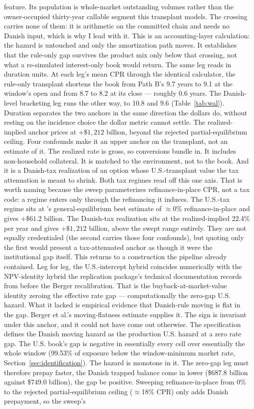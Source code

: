 \documentclass[12pt]{article}
\begin{document}
feature. Its population is whole-market outstanding volumes rather than the owner-occupied thirty-year callable segment this transplant models. The crossing carries none of them: it is arithmetic on the committed chain and needs no Danish input, which is why I lead with it. This is an accounting-layer calculation: the hazard is untouched and only the amortization path moves. It establishes that the rule-only gap survives the product mix only below that crossing, not what a re-simulated interest-only book would return. The same leg reads in duration units. At each leg's mean CPR through the identical calculator, the rule-only transplant shortens the book from Path B's 9.7 years to 9.1 at the window's open and from 8.7 to 8.2 at its close --- roughly 0.6 years. The Danish-level bracketing leg runs the other way, to 10.8 and 9.6 (Table~\ref{tab:wal}). Duration separates the two anchors in the same direction the dollars do, without resting on the incidence choice the dollar metric cannot settle. The realized-implied anchor prices at $+\$1{,}212$ billion, beyond the rejected partial-equilibrium ceiling. Four confounds make it an upper anchor on the transplant, not an estimate of it. The realized rate is gross, so conversions bundle in. It includes non-household collateral. It is matched to the environment, not to the book. And it is a Danish-tax realization of an option whose U.S.-transplant value the tax attenuation is meant to shrink. Both tax regimes read off this one axis. That is worth naming because the sweep parameterizes refinance-in-place CPR, not a tax code: a regime enters only through the refinancing it induces. The U.S.-tax regime sits at \citeauthor{berger2026}'s general-equilibrium best estimate of $\approx$0\% refinance-in-place and gives $+\$61.2$ billion. The Danish-tax realization sits at the realized-implied 22.4\% per year and gives $+\$1{,}212$ billion, above the swept range entirely. They are not equally credentialed (the second carries those four confounds), but quoting only the first would present a tax-attenuated anchor as though it were the institutional gap itself. This returns to a construction the pipeline already contained. Leg for leg, the U.S.-intercept hybrid coincides numerically with the NPV-identity hybrid the replication package's technical documentation records from before the Berger recalibration. That is the buyback-at-market-value identity zeroing the effective rate gap --- computationally the zero-gap U.S. hazard. What it lacked is empirical evidence that Danish-rule moving is flat in the gap. Berger et al.'s moving-flatness estimate supplies it. The sign is invariant under this anchor, and it could not have come out otherwise. The specification defines the Danish moving hazard as the production U.S. hazard at a zero rate gap. The U.S. book's gap is negative in essentially every cell over essentially the whole window (99.53\% of exposure below the window-minimum market rate, Section~\ref{sec:identification}). The hazard is monotone in it. The zero-gap leg must therefore prepay faster, the Danish trapped balance come in lower (\$687.8 billion against \$749.0 billion), the gap be positive. Sweeping refinance-in-place from 0\% to the rejected partial-equilibrium ceiling ($\approx$18\% CPR) only adds Danish prepayment, so the sweep's 
\end{document}
